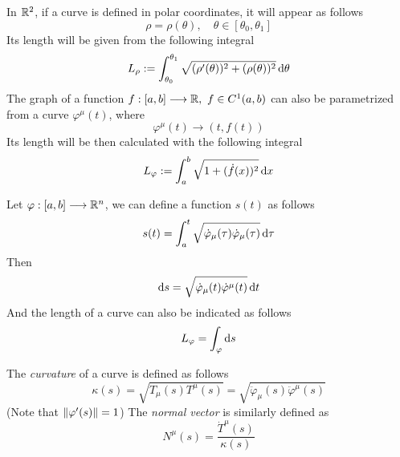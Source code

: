 \documentclass[../complete.tex]{subfiles}
\begin{document}
\begin{rmk}
	In $\mathbb{R}^2$, if a curve is defined in polar coordinates, it will appear as follows
	\begin{equation}
		\rho=\rho(\theta),\quad\theta\in[\theta_0,\theta_1]
		\label{eq:polarcurve}
	\end{equation}
	Its length will be given from the following integral
	\begin{equation}
		L_\rho:=\int_{\theta_0}^{\theta_1}\sqrt{(\rho'(\theta))^2+(\rho(\theta))^2}\operatorname{d\!}{\theta}
		\label{eq:polarcurvelength}
	\end{equation}
	The graph of a function $f:[a,b]\overset{}{\longrightarrow}\mathbb{R},\ f\in C^1(a,b)$ can also be parametrized from a curve $\varphi^\mu(t)$, where
	\begin{equation}
		\varphi^\mu(t)\to(t,f(t))
		\label{eq:1dfgraph}
	\end{equation}
	Its length will be then calculated with the following integral
	\begin{equation}
		L_\varphi:=\int_{a}^{b}\sqrt{1+(\dot{f}(x))^2}\operatorname{d\!}{x}
		\label{eq:1dfgraphlength}
	\end{equation}
\end{rmk}
\begin{dfn}
	Let $\varphi:[a,b]\overset{}{\longrightarrow}\mathbb{R}^n$, we can define a function $s(t)$ as follows
	\begin{equation}
		s(t)=\int_{a}^{t}\sqrt{\dot{\varphi}_\mu(\tau)\dot{\varphi}_\mu(\tau)}\operatorname{d\!}{\tau}
		\label{eq:curvcoord}
	\end{equation}
	Then
	\begin{equation}
		\operatorname{d\!}{s}=\sqrt{\dot{\varphi}_\mu(t)\dot{\varphi}^\mu(t)}\operatorname{d\!}{t}
		\label{eq:diffcurvcoord}
	\end{equation}
	And the length of a curve can also be indicated as follows
	\begin{equation}
		L_\varphi=\int_\varphi\operatorname{d\!}{s}
		\label{eq:curvelength2}
	\end{equation}
\end{dfn}
\begin{dfn}
	The \textit{curvature} of a curve is defined as follows
	\begin{equation}
		\kappa(s)=\sqrt{T_\mu(s)T^\mu(s)}=\sqrt{\ddot{\varphi}_\mu(s)\ddot{\varphi}^\mu(s)}
		\label{eq:curvature}
	\end{equation}
	(Note that $\norm{\varphi'(s)}=1$)
	The \textit{normal vector} is similarly defined as
	\begin{equation}
		N^\mu(s)=\frac{\dot{T}^\mu(s)}{\kappa(s)}
		\label{eq:normalcurve}
	\end{equation}
\end{dfn}
\end{document}
